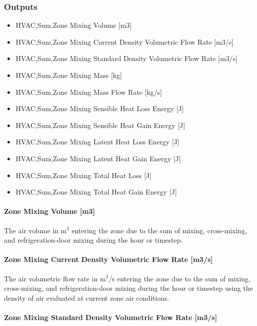\subsubsection{Outputs}\label{outputs-3-000}

\begin{itemize}
\item
  HVAC,Sum,Zone Mixing Volume {[}m3{]}
\item
  HVAC,Sum,Zone Mixing Current Density Volumetric Flow Rate {[}m3/s{]}
\item
  HVAC,Sum,Zone Mixing Standard Density Volumetric Flow Rate {[}m3/s{]}
\item
  HVAC,Sum,Zone Mixing Mass {[}kg{]}
\item
  HVAC,Sum,Zone Mixing Mass Flow Rate {[}kg/s{]}
\item
  HVAC,Sum,Zone Mixing Sensible Heat Loss Energy {[}J{]}
\item
  HVAC,Sum,Zone Mixing Sensible Heat Gain Energy {[}J{]}
\item
  HVAC,Sum,Zone Mixing Latent Heat Loss Energy {[}J{]}
\item
  HVAC,Sum,Zone Mixing Latent Heat Gain Energy {[}J{]}
\item
  HVAC,Sum,Zone Mixing Total Heat Loss {[}J{]}
\item
  HVAC,Sum,Zone Mixing Total Heat Gain Energy {[}J{]}
\end{itemize}

\paragraph{Zone Mixing Volume {[}m3{]}}\label{zone-mixing-volume-m3}

The air volume in m\(^{3}\) entering the zone due to the sum of mixing, cross-mixing, and refrigeration-door mixing during the hour or timestep.

\paragraph{Zone Mixing Current Density Volumetric Flow Rate {[}m3/s{]}}\label{zone-mixing-current-density-volumetric-flow-rate-m3s}

The air volumetric flow rate in m\(^{3}\)/s entering the zone due to the sum of mixing, cross-mixing, and refrigeration-door mixing during the hour or timestep using the density of air evaluated at current zone air conditions.

\paragraph{Zone Mixing Standard Density Volumetric Flow Rate {[}m3/s{]}}\label{zone-mixing-standard-density-volumetric-flow-rate-m3s}

